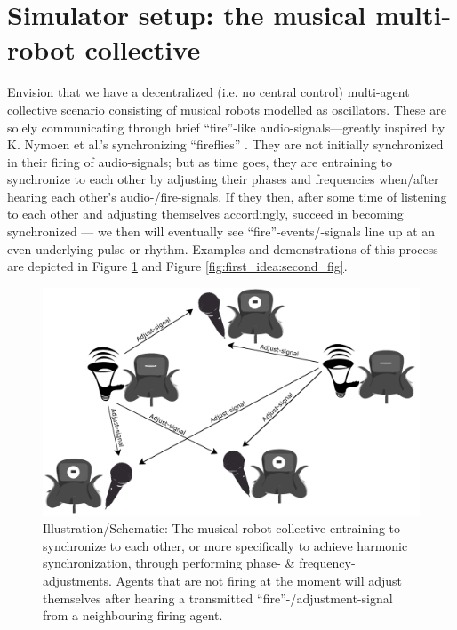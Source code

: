 \section{Simulator setup: the musical multi-robot collective}
\label{sec:developed_system}






Envision that we have a decentralized (i.e. no central control) multi-agent collective scenario consisting of musical robots modelled as oscillators. These are solely communicating through brief ``fire''-like audio-signals—greatly inspired by K. Nymoen et al.'s synchronizing ``fireflies'' \cite{nymoen_synch}. They are not initially synchronized in their firing of audio-signals; but as time goes, they are entraining to synchronize to each other by adjusting their phases and frequencies when/after hearing each other's audio-/fire-signals. If they then, after some time of listening to each other and adjusting themselves accordingly, succeed in becoming synchronized — we then will eventually see ``fire''-events/-signals line up at an even underlying pulse or rhythm. Examples and demonstrations of this process are depicted in Figure \ref{fig:first_idea:first_fig} and Figure \ref{fig:first_idea:second_fig}.

\begin{figure}[h]
	\centering
	\includegraphics[width=0.9\linewidth]{Assets/DocSegments/Chapters/Implementation/Figures/Illustrations/schematic_initial_idea.pdf}
	\caption[Illustration/schematic of the developed multi musical robot collective/system]{Illustration/Schematic: The musical robot collective entraining to synchronize to each other, or more specifically to achieve harmonic synchronization, through performing phase- \& frequency-adjustments. Agents that are not firing at the moment will adjust themselves after hearing a transmitted ``fire''-/adjustment-signal from a neighbouring firing agent.}
	\label{fig:first_idea:first_fig}
\end{figure}

